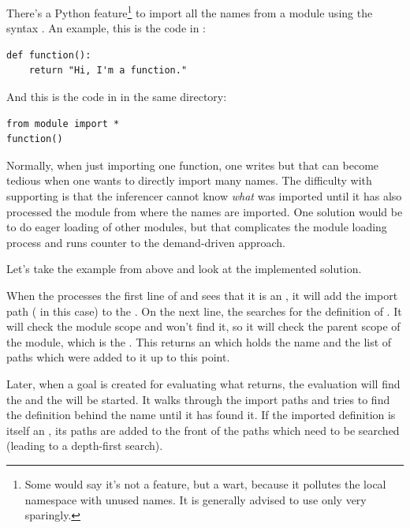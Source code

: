 \documentclass[12pt,halfparskip]{scrreprt}
\begin{document}

There's a Python feature\footnote{Some would say it's not a feature, but a wart, because it pollutes the local namespace with unused names. It is generally advised to use  only very sparingly.} to import all the names from a module using the syntax . An example, this is the code in :

\begin{lstlisting}
def function():
    return "Hi, I'm a function."
\end{lstlisting}

And this is the code in  in the same directory:

\begin{lstlisting}
from module import *
function()
\end{lstlisting}

Normally, when just importing one function, one writes  but that can become tedious when one wants to directly import many names. The difficulty with supporting  is that the inferencer cannot know \emph{what} was imported until it has also processed the module from where the names are imported. One solution would be to do eager loading of other modules, but that complicates the module loading process and runs counter to the demand-driven approach.

Let's take the example from above and look at the implemented solution.

When the  processes the first line of  and sees that it is an , it will add the import path ( in this case) to the . On the next line, the  searches for the definition of . It will check the module scope and won't find it, so it will check the parent scope of the module, which is the . This returns an  which holds the name and the list of  paths which were added to it up to this point.

Later, when a goal is created for evaluating what  returns, the evaluation will find the   and the  will be started. It walks through the import paths and tries to find the definition behind the name  until it has found it. If the imported definition is itself an , its paths are added to the front of the paths which need to be searched (leading to a depth-first search).
\end{document}
